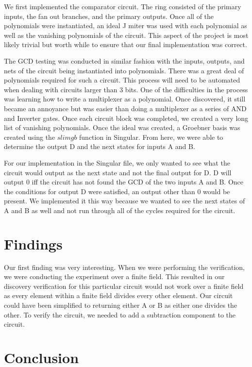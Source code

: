 \documentclass[12pt]{report}
\begin{document}
We first implemented the comparator circuit. The ring consisted of the primary inputs, the fan out branches, and the primary outputs. Once all of the polynomials were instantiated, an ideal J miter was used with each polynomial as well as the vanishing polynomials of the circuit. This aspect of the project is most likely trivial but worth while to ensure that our final implementation was correct. 

The GCD testing was conducted in similar fashion with the inputs, outputs, and nets of the circuit being instantiated into polynomials. There was a great deal of polynomials required for such a circuit. This process will need to be automated when dealing with circuits larger than 3 bits. One of the difficulties in the process was learning how to write a multiplexer as a polynomial. Once discovered, it still became an annoyance but was easier than doing a multiplexer as a series of AND and Inverter gates. Once each circuit block was completed, we created a very long list of vanishing polynomials. Once the ideal was created, a Groebner basis was created using the $slimgb$ function in Singular. From here, we were able to determine the output D and the next states for inputs A and B. 

For our implementation in the Singular file, we only wanted to see what the circuit would output as the next state and not the final output for D. D will output 0 iff the circuit has not found the GCD of the two inputs A and B. Once the conditions for output D were satisfied, an output other than 0 would be present. We implemented it this way because we wanted to see the next states of A and B as well and not run through all of the cycles required for the circuit. 

\section{Findings}

Our first finding was very interesting. When we were performing the verification, we were conducting the experiment over a finite field. This resulted in our discovery verification for this particular circuit would not work over a finite field as every element within a finite field divides every other element. Our circuit could have been simplified to returning either A or B as either one divides the other. To verify the circuit, we needed to add a subtraction component to the circuit.

\section{Conclusion}



%
\end{document}
